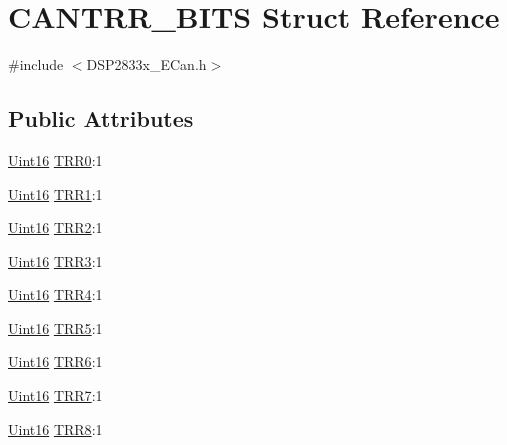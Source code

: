 \hypertarget{struct_c_a_n_t_r_r___b_i_t_s}{}\section{C\+A\+N\+T\+R\+R\+\_\+\+B\+I\+T\+S Struct Reference}
\label{struct_c_a_n_t_r_r___b_i_t_s}


{\ttfamily \#include $<$D\+S\+P2833x\+\_\+\+E\+Can.\+h$>$}

\subsection*{Public Attributes}
\begin{DoxyCompactItemize}
\item 
\hyperlink{_d_s_p2833x___device_8h_a59a9f6be4562c327cbfb4f7e8e18f08b}{Uint16} \hyperlink{struct_c_a_n_t_r_r___b_i_t_s_aadbc043e1f06b999d33d7e808547245e}{T\+R\+R0}\+:1
\item 
\hyperlink{_d_s_p2833x___device_8h_a59a9f6be4562c327cbfb4f7e8e18f08b}{Uint16} \hyperlink{struct_c_a_n_t_r_r___b_i_t_s_af26dec9e79609da50fd5a85bac43c1b5}{T\+R\+R1}\+:1
\item 
\hyperlink{_d_s_p2833x___device_8h_a59a9f6be4562c327cbfb4f7e8e18f08b}{Uint16} \hyperlink{struct_c_a_n_t_r_r___b_i_t_s_ac393602a8a5d6733e0475f2cd9916d33}{T\+R\+R2}\+:1
\item 
\hyperlink{_d_s_p2833x___device_8h_a59a9f6be4562c327cbfb4f7e8e18f08b}{Uint16} \hyperlink{struct_c_a_n_t_r_r___b_i_t_s_abb91c34867138507ddf7b730db60a862}{T\+R\+R3}\+:1
\item 
\hyperlink{_d_s_p2833x___device_8h_a59a9f6be4562c327cbfb4f7e8e18f08b}{Uint16} \hyperlink{struct_c_a_n_t_r_r___b_i_t_s_a59f76a1563497fa8215ef6f7761c44f9}{T\+R\+R4}\+:1
\item 
\hyperlink{_d_s_p2833x___device_8h_a59a9f6be4562c327cbfb4f7e8e18f08b}{Uint16} \hyperlink{struct_c_a_n_t_r_r___b_i_t_s_ab9290c66777b0101846e358fbc215dd9}{T\+R\+R5}\+:1
\item 
\hyperlink{_d_s_p2833x___device_8h_a59a9f6be4562c327cbfb4f7e8e18f08b}{Uint16} \hyperlink{struct_c_a_n_t_r_r___b_i_t_s_a9d8bd961b1c3221eebe27f93fbde2788}{T\+R\+R6}\+:1
\item 
\hyperlink{_d_s_p2833x___device_8h_a59a9f6be4562c327cbfb4f7e8e18f08b}{Uint16} \hyperlink{struct_c_a_n_t_r_r___b_i_t_s_a10869762ba1d2be289b496d749836f4f}{T\+R\+R7}\+:1
\item 
\hyperlink{_d_s_p2833x___device_8h_a59a9f6be4562c327cbfb4f7e8e18f08b}{Uint16} \hyperlink{struct_c_a_n_t_r_r___b_i_t_s_adbb0fc13c917762275556344c1ad6830}{T\+R\+R8}\+:1

\end{DoxyCompactItemize}
